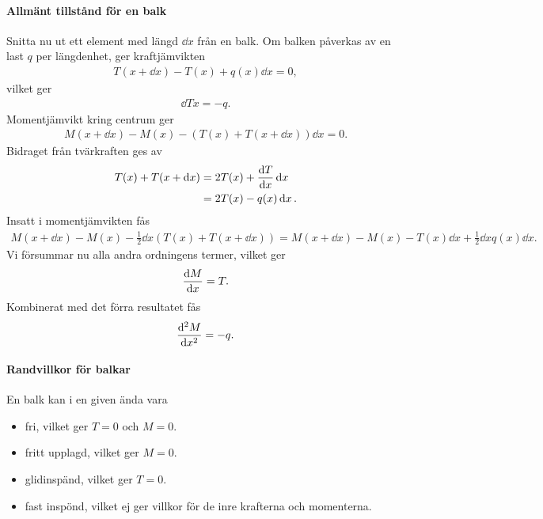 \paragraph{Allmänt tillstånd för en balk}
Snitta nu ut ett element med längd $\dd{x}$ från en balk. Om balken påverkas av en last $q$ per längdenhet, ger kraftjämvikten
\begin{align*}
	T(x + \dd{x}) - T(x) + q(x)\dd{x} = 0,
\end{align*}
vilket ger
\begin{align*}
	\dd{T}{x} = -q.
\end{align*}
Momentjämvikt kring centrum ger
\begin{align*}
	M(x + \dd{x}) - M(x) - (T(x) + T(x + \dd{x}))\dd{x} = 0.
\end{align*}
Bidraget från tvärkraften ges av
\begin{align*}
	T(x) + T(x + \dd{x}) &= 2T(x) + \dv{T}{x}\dd{x} \\
	                     &= 2T(x) - q(x)\dd{x}.
\end{align*}
Insatt i momentjämvikten fås
\begin{align*}
	M(x + \dd{x}) - M(x) - \frac{1}{2}\dd{x}(T(x) + T(x + \dd{x})) = M(x + \dd{x}) - M(x) - T(x)\dd{x} + \frac{1}{2}\dd{x}q(x)\dd{x}.
\end{align*}
Vi försummar nu alla andra ordningens termer, vilket ger
\begin{align*}
	\dv{M}{x} = T.
\end{align*}
Kombinerat med det förra resultatet fås
\begin{align*}
	\dv[2]{M}{x} = -q.
\end{align*}

\paragraph{Randvillkor för balkar}
En balk kan i en given ända vara
\begin{itemize}
	\item fri, vilket ger $T = 0$ och $M = 0$.
	\item fritt upplagd, vilket ger $M = 0$.
	\item glidinspänd, vilket ger $T = 0$.
	\item fast inspönd, vilket ej ger villkor för de inre krafterna och momenterna.
\end{itemize}

